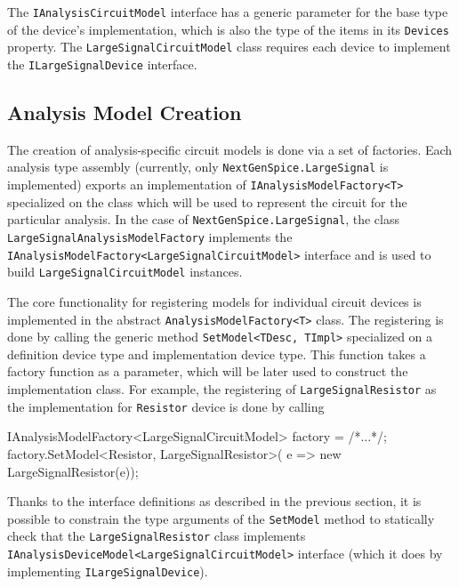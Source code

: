 The \texttt{IAnalysisCircuit\+Model} interface has a generic parameter for the base type of the device's implementation, which is also the type of the items in its \texttt{Devices} property. The \texttt{LargeSignalCircuitModel} class requires each device to implement the \texttt{ILargeSignalDevice} interface. 


\subsection{Analysis Model Creation}

The creation of analysis-specific circuit models is done via a set of factories. Each analysis type assembly  (currently, only \texttt{NextGenSpice.LargeSignal} is implemented) exports an implementation of \texttt{IAnalysisModelFactory<T>} specialized on the class which will be used to represent the circuit for the particular analysis. In the case of \texttt{NextGenSpice.LargeSignal}, the class \texttt{LargeSignalAnalysisModel\+Factory} implements the \texttt{IAnalysisModelFactory<Large\+SignalCircuitModel>} interface and is used to build \texttt{LargeSignalCircuitModel} instances.

The core functionality for registering models for individual circuit devices is implemented in the abstract \texttt{AnalysisModelFactory<T>} class. The registering is done by calling the generic method \texttt{SetModel<TDesc, TImpl>} specialized on a definition device type and implementation device type. This function takes a factory function as a parameter, which will be later used to construct the implementation class. For example, the registering of \texttt{LargeSignal\+Resistor} as the implementation for \texttt{Resistor} device is done by calling

\begin{csharpcode}
IAnalysisModelFactory<LargeSignalCircuitModel> factory = /*...*/;
factory.SetModel<Resistor, LargeSignalResistor>(
	e => new LargeSignalResistor(e));
\end{csharpcode}

Thanks to the interface definitions as described in the previous section, it is possible to constrain the type arguments of the \texttt{SetModel} method to statically check that the \texttt{LargeSignalResistor} class implements \texttt{IAnalysisDeviceModel\+<LargeSignalCircuitModel>} interface (which it does by implementing \texttt{ILarge\+SignalDevice}). 

